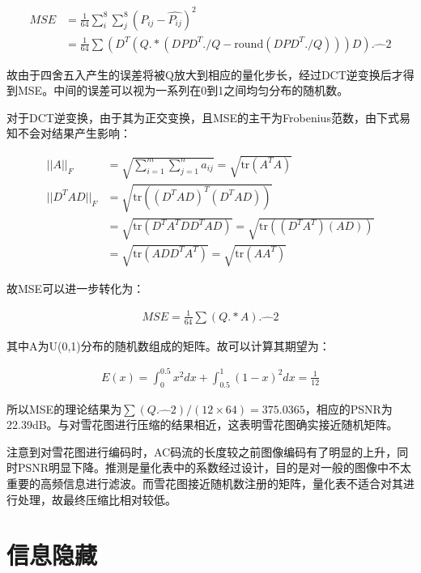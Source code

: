 \documentclass[10pt, a4paper]{article}
\begin{document}
\begin{align*}
    MSE & = \frac{1}{64} \sum_i^8\sum_j^8 (P_{ij} - \hat{P_{ij}})^2                            \\
        & = \frac{1}{64} \sum (D^T (Q.*(DPD^T./Q - \text{round}(DPD^T ./ Q))) D).\hat{\quad} 2
\end{align*}

故由于四舍五入产生的误差将被Q放大到相应的量化步长，经过DCT逆变换后才得到MSE。中间的误差可以视为一系列在0到1之间均匀分布的随机数。

对于DCT逆变换，由于其为正交变换，且MSE的主干为Frobenius范数，由下式易知不会对结果产生影响：

\begin{align*}
    ||A||_F     & = \sqrt{\sum_{i=1}^m\sum_{j=1}^n a_{ij}} = \sqrt{\text{tr}(A^TA)}                                   \\
    ||D^TAD||_F & = \sqrt{\text{tr}((D^TAD)^T(D^TAD))}                                                                \\
                & = \sqrt{\text{tr}(D^TA^TDD^TAD)}                                   = \sqrt{\text{tr}((D^TA^T)(AD))} \\
                & = \sqrt{\text{tr}(ADD^TA^T)}                                       = \sqrt{\text{tr}(AA^T)}
\end{align*}

故MSE可以进一步转化为：

\begin{align*}
    MSE = \frac{1}{64}\sum(Q.*A).\hat{\quad} 2
\end{align*}

其中A为U(0,1)分布的随机数组成的矩阵。故可以计算其期望为：

\begin{align*}
    E(x) = \int_0^{0.5}x^2dx + \int_{0.5}^1(1-x)^2dx = \frac{1}{12}
\end{align*}

所以MSE的理论结果为$\sum(Q.\hat{\quad} 2)/(12\times 64) = 375.0365$，相应的PSNR为22.39dB。与对雪花图进行压缩的结果相近，这表明雪花图确实接近随机矩阵。

注意到对雪花图进行编码时，AC码流的长度较之前图像编码有了明显的上升，同时PSNR明显下降。推测是量化表中的系数经过设计，目的是对一般的图像中不太重要的高频信息进行滤波。而雪花图接近随机数注册的矩阵，量化表不适合对其进行处理，故最终压缩比相对较低。

\section{信息隐藏}
\end{document}
